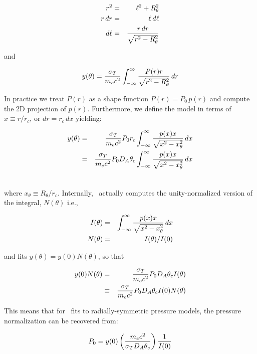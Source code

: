 \begin{eqnarray}
r^2 &=& \ell^2 + R_\theta^2\\
r\,dr &=& \ell\,d\ell\\
d\ell &=& {{r\,dr}\over{\sqrt{r^2 - R_\theta^2}}}
\end{eqnarray}

and 

\begin{equation}
y(\theta) = {{\sigma_T}\over{m_e c^2}}\int^{\infty}_{-\infty}{{{P(r)r}\over{\sqrt{r^2 - R_\theta^2}}}\,dr}
\end{equation}

In practice we treat $P(r)$ as a shape function $P(r) = P_0\,p(r)$ and
compute the 2D projection of $p(r)$.  Furthermore, we define the model
in terms of $x\equiv r/r_c$, or $dr = r_c\,dx$ yielding:

\begin{eqnarray}
y(\theta) &=& {{\sigma_T}\over{m_e c^2}}P_0r_c\int^{\infty}_{-\infty}{{{p(x)x}\over{\sqrt{x^2 - x^2_\theta}}}\,dx}\\\nonumber
          &=& {{\sigma_T}\over{m_e c^2}}P_0D_A\theta_c\int^{\infty}_{-\infty}{{{p(x)x}\over{\sqrt{x^2 - x^2_\theta}}}\,dx}\\\nonumber
\end{eqnarray}

where $x_\theta\equiv R_\theta/r_c$.  Internally, \climax\ actually
computes the unity-normalized version of the integral, $N(\theta)$
i.e.,

\begin{eqnarray}
I(\theta) &=& \int^{\infty}_{-\infty}{{{p(x)x}\over{\sqrt{x^2 - x^2_\theta}}}\,dx}\\\nonumber
N(\theta) &=& I(\theta)/I(0)
\end{eqnarray}

and fits $y(\theta) = y(0)N(\theta)$, so that

\begin{eqnarray}
y(0)N(\theta) &=& {{\sigma_T}\over{m_e c^2}} P_0D_A\theta_c I(\theta)\\\nonumber
              &\equiv& {{\sigma_T}\over{m_e c^2}} P_0D_A\theta_c I(0)N(\theta)
\end{eqnarray}

This means that for \climax\ fits to radially-symmetric pressure
models, the pressure normalization can be recovered from:

\begin{equation}
P_0 = y(0)\left({{m_e c^2}\over{\sigma_T D_A\theta_c}}\right){1\over{I(0)}}
\label{eq:ytop}
\end{equation}

